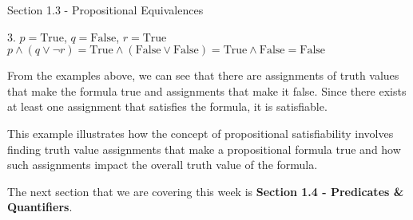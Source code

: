 \begin{notes}{Section 1.3 - Propositional Equivalences}
\begin{Highlight}
        3. \(p = \text{True}\), \(q = \text{False}\), \(r = \text{True}\)
        \(p \land (q \lor \neg r) = \text{True} \land (\text{False} \lor \text{False}) = \text{True} \land \text{False} = \text{False}\)

    
        From the examples above, we can see that there are assignments of truth values that make the formula true and assignments that make it false. Since there exists at least one assignment that satisfies the formula, it is satisfiable.
    
        This example illustrates how the concept of propositional satisfiability involves finding truth value assignments that make a propositional formula true and how such assignments impact the overall truth value of the formula.
    \end{Highlight}
\end{notes}

The next section that we are covering this week is \textbf{Section 1.4 - Predicates \& Quantifiers}.

